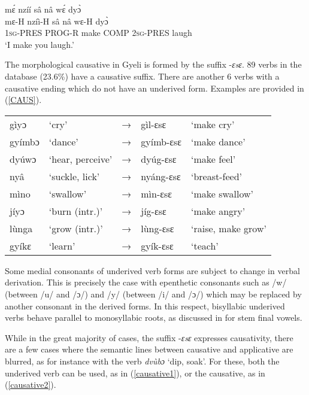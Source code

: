 \begin{exe} 
\ex\label{CAUS1}
  \glll     mɛ́ nzíí sâ nâ wɛ́ dyɔ̀\\
	mɛ-H nzíì-H sâ nâ wɛ-H dyɔ̀ \\
              1\textsc{sg}-PRES PROG-R make COMP 2\textsc{sg}-PRES laugh  \\
    \trans `I make you laugh.'
\end{exe}

The morphological causative in Gyeli is formed by the suffix -{\itshape ɛsɛ}. 89 verbs in the database (23.6\%) have a causative suffix. There are another 6 verbs with a causative ending which do not  have an underived form. Examples are provided in (\ref{CAUS}).

\begin{exe} \ex \label{CAUS}
\begin{tabular}{lllll}
gìyɔ & `cry' & → & gìl-ɛsɛ & `make cry' \\
gyímbɔ & `dance' & → & gyímb-ɛsɛ & `make dance' \\
dyúwɔ & `hear, perceive' & → & dyúg-ɛsɛ & `make feel' \\
nyâ & `suckle, lick' & → & nyáng-ɛsɛ & `breast-feed' \\
mìno & `swallow' & → & mìn-ɛsɛ & `make swallow' \\
jíyɔ & `burn (intr.)' & → & jíg-ɛsɛ & `make angry' \\
lùnga & `grow (intr.)' &  → & lùng-ɛsɛ & `raise, make grow' \\
gyíkɛ & `learn' & → & gyík-ɛsɛ & `teach' \\
\end{tabular}
\end{exe} 

Some medial consonants of underived verb forms are subject to change in verbal derivation. This is precisely the case with epenthetic consonants such as /w/ (between /u/ and /ɔ/) and /y/ (between /i/ and /ɔ/) which may be replaced by another consonant in the derived forms. In this respect, bisyllabic underived verbs behave parallel to monosyllabic roots, as discussed in  for stem final vowels.


While in the great majority of cases, the suffix -{\itshape ɛsɛ} expresses causativity, there are a few cases where the semantic lines between causative and applicative are blurred, as for instance with the verb {\itshape dvùbɔ} `dip, soak'.  For these, both the underived verb can be used, as in (\ref{causative1}), or the causative, as in (\ref{causative2}).

